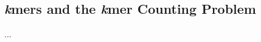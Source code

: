 \subsection{\textit{k}mers and the \textit{k}mer Counting Problem} \label{background:kmers_and_the_kmer_counting_problem}
...
